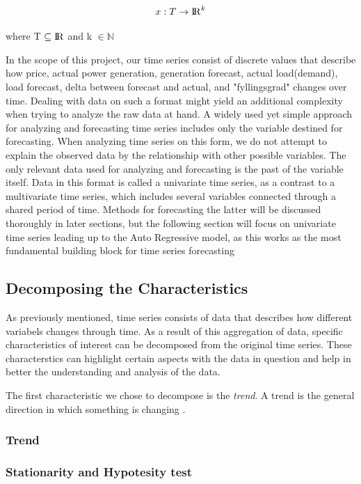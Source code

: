 \documentclass
[twocolumn,
secnumarabic,
nobibnotes,
aps,
prl,
reprint,
groupedaddress,
amsmath,
amssymb,
]{revtex4-2}
\begin{document}
\begin{equation}
  x: T \rightarrow  {\rm I\!R}^k 
\end{equation}

where T $\subseteq {\rm I\!R}$ and k $\in \mathbb{N}$ \cite{Auffarth2021}

In the scope of this project, our time series consist of discrete values that describe how price, actual power generation, generation forecast, actual load(demand), load forecast, delta between forecast and actual, and "fyllingsgrad" changes over time. 
Dealing with data on such a format might yield an additional complexity when trying to analyze the raw data at hand. A widely used yet simple approach for analyzing and forecasting time series includes only the variable destined for forecasting.  When analyzing time series on this form, we do not attempt to explain the observed data by the relationship with other possible variables. The only relevant data used for analyzing and forecasting is the past of the variable itself. Data in this format is called a univariate time series, as a contrast to a multivariate time series, which includes several variables connected through a shared period of time. Methods for forecasting the latter will be discussed thoroughly in later sections, but the following section will focus on univariate time series leading up to the Auto Regressive model, as this works as the most fundamental building block for time series forecasting \cite{Korstanje2021} 

\subsection{Decomposing the Characteristics}
As previously mentioned, time series consists of data that describes how different variabels changes through time. As a result of this aggregation of data, specific characteristics of interest can be decomposed from the original time series. These characterstics can highlight certain aspects with the data in question and help in better the understanding and analysis of the data.  

The first characteristic we chose to decompose is the \emph{trend}. A trend is the general direction in which something is changing \cite{Auffarth2021}. 

\subsubsection{Trend}

\subsubsection{Stationarity and Hypotesity test}
\end{document}
